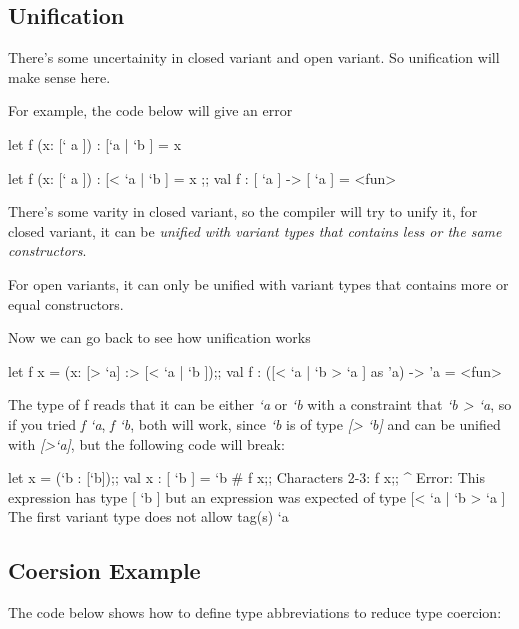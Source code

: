 \subsection{Unification}
\label{sec:unification}

There's some uncertainity in closed variant and open variant. So
unification will make sense here.

For example, the code below will give an error

\begin{ocamlcode}
let f (x: [` a  ]) : [`a | `b ] = x  
\end{ocamlcode}

\begin{ocamlcode}
  let f (x: [` a  ]) : [< `a | `b ] = x ;;
  val f : [ `a ] -> [ `a ] = <fun>
\end{ocamlcode}
There's some varity in closed variant, so the compiler will try to
unify it, for closed variant, it can be \textit{unified with variant types
that contains less or the same constructors}.

For open variants,  it can only be unified with variant types that
contains more or equal constructors.

Now we can go back to see how unification works
\begin{ocamlcode}
  let f x  =  (x: [> `a] :> [< `a | `b ]);;
  val f : ([< `a | `b > `a ] as 'a) -> 'a = <fun>
\end{ocamlcode}
The type of f reads that it can be either \textit{`a} or \textit{`b}
with a constraint that \textit{`b > `a},  so if you tried
\textit{f `a}, \textit{f `b}, both will work, since \textit{`b} is of
type \textit{[> `b]} and can be unified with \textit{[>`a]}, but
the following code will break:

\begin{ocamlcode}
let x = (`b : [`b]);;
val x : [ `b ] = `b
# f x;;
Characters 2-3:
  f x;;
    ^
Error: This expression has type [ `b ] but an expression was expected of type
         [< `a | `b > `a ]
       The first variant type does not allow tag(s) `a
\end{ocamlcode}

\subsection{Coersion Example}
\label{sec:coersion-example}

The code below shows how to define type abbreviations to reduce type
coercion:

